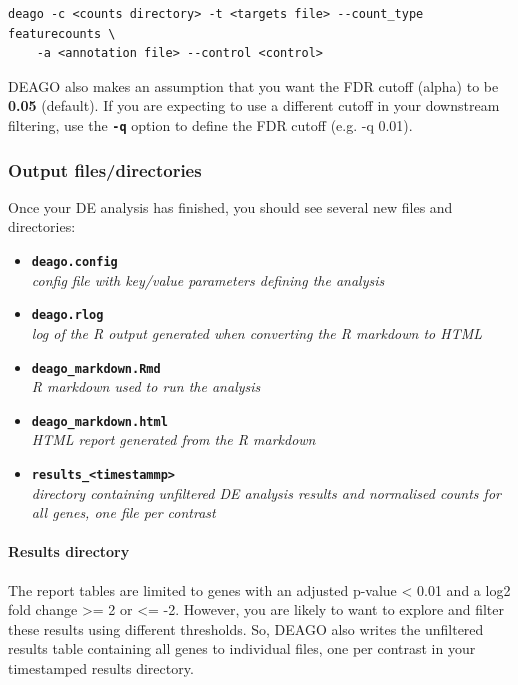 \documentclass[11pt]{article}
\begin{document}
\begin{verbatim}
deago -c <counts directory> -t <targets file> --count_type featurecounts \
    -a <annotation file> --control <control>
\end{verbatim}

DEAGO also makes an assumption that you want the FDR cutoff (alpha) to
be \textbf{0.05} (default). If you are expecting to use a different
cutoff in your downstream filtering, use the \textbf{\texttt{-q}} option
to define the FDR cutoff (e.g. -q 0.01).

\hypertarget{output-filesdirectories}{%
\subsubsection{Output files/directories}\label{output-filesdirectories}}

Once your DE analysis has finished, you should see several new files and
directories:

\begin{itemize}
\item
  \textbf{\texttt{deago.config}}~\\
  \textit{config file with key/value parameters defining the analysis}
\item
  \textbf{\texttt{deago.rlog}}~\\
  \textit{log of the R output generated when converting the R markdown to
  HTML}
\item
  \textbf{\texttt{deago\_markdown.Rmd}}~\\
  \textit{R markdown used to run the analysis}
\item
  \textbf{\texttt{deago\_markdown.html}}~\\
  \textit{HTML report generated from the R markdown}
\item
  \textbf{\texttt{results\_\textless{}timestammp\textgreater{}}}~\\
  \textit{directory containing unfiltered DE analysis results and
  normalised counts for all genes, one file per contrast}
\end{itemize}

\hypertarget{results-directory}{%
\paragraph{Results directory}\label{results-directory}}

The report tables are limited to genes with an adjusted p-value
\textless{} 0.01 and a log2 fold change \textgreater{}= 2 or
\textless{}= -2. However, you are likely to want to explore and filter
these results using different thresholds. So, DEAGO also writes the
unfiltered results table containing all genes to individual files, one
per contrast in your timestamped results directory.
\end{document}
